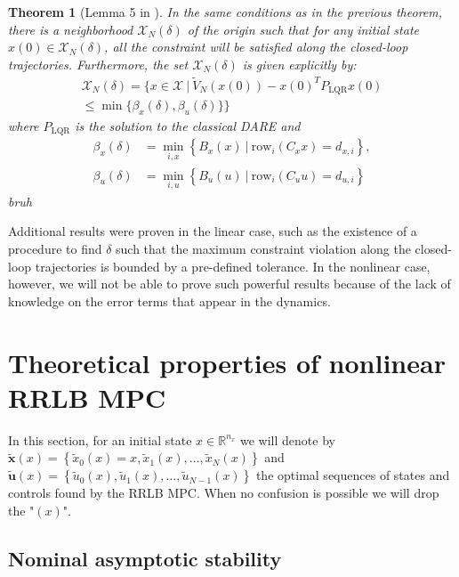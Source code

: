 \documentclass[conference]{IEEEtran}
\newtheorem{theorem}{Theorem}[section]
\theoremstyle{definition}
\theoremstyle{remark}
\def\cal#1{\mathcal{#1}}
\def\rm#1{\mathrm{#1}}
\def\bf#1{\mathbf{#1}}
\newcommand{\R}{\mathbb{R}}
\begin{document}
\begin{theorem}[Lemma 5 in \cite{RRLB-linear-MPC}]
	\label{constraint-satisfaction-guarantee-linear-case}
	In the same conditions as in the previous theorem, there is a neighborhood $\cal{X}_N(\delta)$ of the origin such that for any initial state $x(0)\in\cal{X}_N(\delta)$, all the constraint will be satisfied along the closed-loop trajectories.
	Furthermore, the set $\cal{X}_N(\delta)$ is given explicitly by:
	\begin{multline}
		\cal{X}_N(\delta)=\big\{x\in\cal{X}~|~\tilde{V}_N(x(0))-x(0)^TP_{\rm{LQR}}x(0)\\\leq\min\{\beta_x(\delta),\beta_u(\delta)\}\big\}
	\end{multline}
	where $P_{\rm{LQR}}$ is the solution to the classical DARE and
	\begin{align}
		\beta_x(\delta)&=\underset{i,x}{\min}\left\{ B_x(x)~|~\rm{row}_i(C_xx)=d_{x,i} \right\},\\
		\beta_u(\delta)&=\underset{i,u}{\min}\left\{ B_u(u)~|~\rm{row}_i(C_uu)=d_{u,i} \right\}
	\end{align}
	bruh
\end{theorem}
Additional results were proven in the linear case, such as the existence of a procedure to find $\delta$ such that the maximum constraint violation along the closed-loop trajectories is bounded by a pre-defined tolerance.
In the nonlinear case, however, we will not be able to prove such powerful results because of the lack of knowledge on the error terms that appear in the dynamics.

\section{Theoretical properties of nonlinear RRLB MPC}
\label{sec:RRLB-theoretical-properties}

In this section, for an initial state $x\in\R^{n_x}$ we will denote by $\tilde{\bf{x}}(x)=\left\{ \tilde{x}_0(x)=x,\tilde{x}_1(x),\ldots,\tilde{x}_N(x) \right\}$ and $\tilde{\bf{u}}(x)=\left\{ \tilde{u}_0(x),\tilde{u}_1(x),\ldots,\tilde{u}_{N-1}(x) \right\}$ the optimal sequences of states and controls found by the RRLB MPC.
When no confusion is possible we will drop the "$(x)$".

\subsection{Nominal asymptotic stability}\label{sec:RRLB-nominal-stability}
\end{document}
